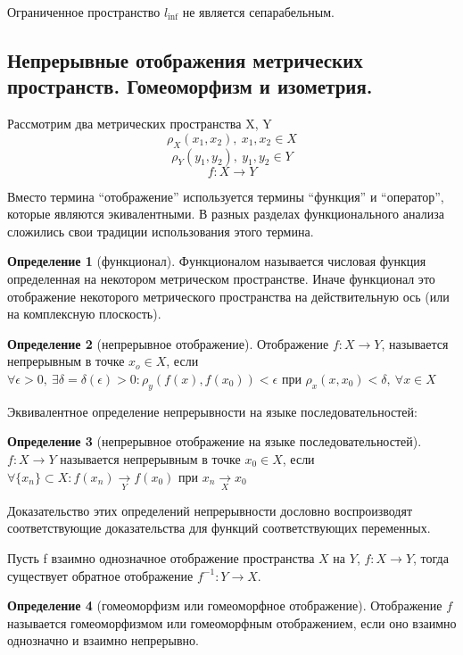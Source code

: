 \documentclass[14pt,a4paper]{extarticle}
\theoremstyle{definition}
\newtheorem{definition}{Определение}[section]
\theoremstyle{remark}
\renewcommand{\[}{\begin{dmath*}[compact]}
\renewcommand{\]}{\end{dmath*}}
\newcommand{\sep}{ , \ \allowbreak }
\begin{document}
Ограниченное пространство $l_{\inf}$ не является сепарабельным.

\subsection{Непрерывные отображения метрических пространств.
Гомеоморфизм и изометрия.}

Рассмотрим два метрических пространства X, Y
\[\rho_X(x_1,x_2)\sep x_1,x_2\in X \]
\[\rho_Y(y_1, y_2)\sep y_1,y_2\in Y \]
\[ {f: X \to Y}\]

Вместо термина ``отображение'' используется термины ``функция'' и
``оператор'', которые являются экивалентными.
В разных разделах функционального анализа сложились свои традиции
использования этого термина.

\begin{definition}[функционал]
  Функционалом называется числовая функция определенная на
  некотором метрическом пространстве.
  Иначе функционал это отображение некоторого метрического
  пространства на действительную ось (или на комплексную плоскость).
\end{definition}

\begin{definition}[непрерывное отображение]
  Отображение $f: X \to Y$, называется непрерывным в точке $x_o \in X$,
  если $ \forall \epsilon > 0 \sep \exists \delta = \delta (\epsilon) > 0:
  \rho_y(f(x), f(x_0)) < \epsilon$ при $\rho_x(x,x_0)<\delta \sep
  \forall x \in X$
\end{definition}

Эквивалентное определение непрерывности на языке последовательностей:
\begin{definition}[непрерывное отображение на языке последовательностей]
  $f: X \to Y$ называется непрерывным в точке $x_0 \in X$, если
  $\forall \{x_n\}\subset X: f(x_n) \xrightarrow[Y]{} f(x_0)$
  при $x_n\xrightarrow[X]{} x_0$
\end{definition}

Доказательство этих определений непрерывности дословно воспроизводят
соответствующие доказательства для функций соответствующих переменных.

Пусть f взаимно однозначное отображение пространства $X$ на $Y$,
$f: X \to Y$, тогда существует обратное отображение
$f^{-1}: Y\to X$.

\begin{definition}[гомеоморфизм или гомеоморфное отображение]
  Отображение $f$ называется гомеоморфизмом или гомеоморфным отображением,
  если оно взаимно однозначно и взаимно непрерывно.
\end{definition}
\end{document}
